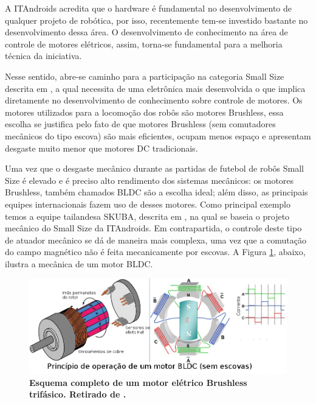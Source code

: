 \documentclass[10pt,fleqn,a4paper]{article}
\begin{document}
    A ITAndroids acredita que o hardware é fundamental no desenvolvimento de qualquer projeto de robótica, por isso, recentemente tem-se investido bastante no desenvolvimento dessa área. O desenvolvimento de conhecimento na área de controle de motores elétricos, assim, torna-se fundamental para a melhoria técnica da iniciativa.
    
    Nesse sentido, abre-se caminho para a participação na categoria Small Size descrita em \cite{robocupregras}, a qual necessita de uma eletrônica mais desenvolvida o que implica diretamente no desenvolvimento de conhecimento sobre controle de motores. Os motores utilizados para a locomoção dos robôs são motores Brushless, essa escolha se justifica pelo fato de que motores Brushless (sem comutadores mecânicos do tipo escova) são mais eficientes, ocupam menos espaço e apresentam desgaste muito menor que motores DC tradicionais.
    
    Uma vez que o desgaste mecânico durante as partidas de futebol de robôs Small Size é elevado e é preciso alto rendimento dos sistemas mecânicos: os motores Brushless, também chamados BLDC são a escolha ideal; além disso, as principais equipes internacionais fazem uso de desses motores. Como principal exemplo temos a equipe tailandesa SKUBA, descrita em \cite{skuba}, na qual se baseia o projeto mecânico do Small Size da ITAndroids. Em contrapartida, o controle deste tipo de atuador mecânico se dá de maneira mais complexa, uma vez que a comutação do campo magnético não é feita mecanicamente por escovas. A Figura \ref{fig:esquemamotor}, abaixo, ilustra a mecânica de um motor BLDC.

	\begin{figure}[ht]
		\begin{center}
			\includegraphics[angle=0, scale=0.4]{images/4-Pole-brushless-DC-motor-animation}
		\end{center}
		\caption{\textbf{Esquema completo de um motor elétrico Brushless trifásico. Retirado de \cite{figuramotor}.}}
		\label{fig:esquemamotor}
	\end{figure}
    
\end{document}
